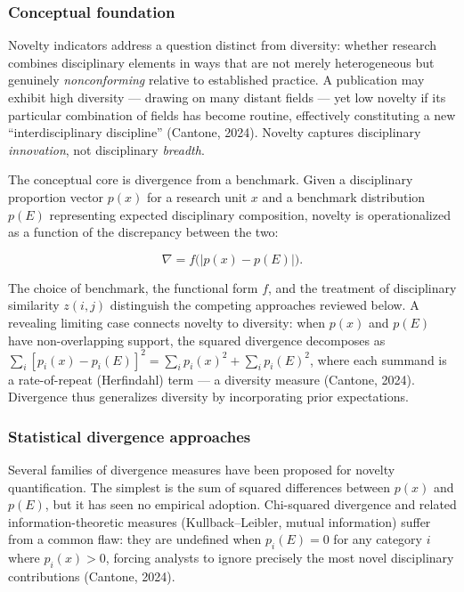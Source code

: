 \documentclass[
]{article}
\begin{document}
\hypertarget{conceptual-foundation}{%
\subsubsection{Conceptual foundation}\label{conceptual-foundation}}

Novelty indicators address a question distinct from diversity: whether
research combines disciplinary elements in ways that are not merely
heterogeneous but genuinely \emph{nonconforming} relative to established
practice. A publication may exhibit high diversity --- drawing on many
distant fields --- yet low novelty if its particular combination of
fields has become routine, effectively constituting a new
``interdisciplinary discipline'' (Cantone, 2024). Novelty captures
disciplinary \emph{innovation}, not disciplinary \emph{breadth}.

The conceptual core is divergence from a benchmark. Given a disciplinary
proportion vector \(p(x)\) for a research unit \(x\) and a benchmark
distribution \(p(E)\) representing expected disciplinary composition,
novelty is operationalized as a function of the discrepancy between the
two:

\[\nabla = f\!\bigl(\lvert p(x) - p(E) \rvert\bigr).\]

The choice of benchmark, the functional form \(f\), and the treatment of
disciplinary similarity \(z(i,j)\) distinguish the competing approaches
reviewed below. A revealing limiting case connects novelty to diversity:
when \(p(x)\) and \(p(E)\) have non-overlapping support, the squared
divergence decomposes as
\(\sum_i [p_i(x) - p_i(E)]^2 = \sum_i p_i(x)^2 + \sum_i p_i(E)^2\),
where each summand is a rate-of-repeat (Herfindahl) term --- a diversity
measure (Cantone, 2024). Divergence thus generalizes diversity by
incorporating prior expectations.

\hypertarget{statistical-divergence-approaches}{%
\subsubsection{Statistical divergence
approaches}\label{statistical-divergence-approaches}}

Several families of divergence measures have been proposed for novelty
quantification. The simplest is the sum of squared differences between
\(p(x)\) and \(p(E)\), but it has seen no empirical adoption.
Chi-squared divergence and related information-theoretic measures
(Kullback--Leibler, mutual information) suffer from a common flaw: they
are undefined when \(p_i(E) = 0\) for any category \(i\) where
\(p_i(x) > 0\), forcing analysts to ignore precisely the most novel
disciplinary contributions (Cantone, 2024).
\end{document}
